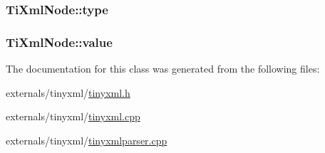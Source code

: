 \hypertarget{class_ti_xml_node_a2619c6379181c16ba95ae6922e2ca839}{
\subsubsection[{type}]{ Ti\-Xml\-Node\-::type\hspace{0.3cm}{\ttfamily [protected]}}}\label{class_ti_xml_node_a2619c6379181c16ba95ae6922e2ca839}
\hypertarget{class_ti_xml_node_aead528b3cedc33c16a6c539872c7cc8b}{
\subsubsection[{value}]{ Ti\-Xml\-Node\-::value\hspace{0.3cm}{\ttfamily [protected]}}}\label{class_ti_xml_node_aead528b3cedc33c16a6c539872c7cc8b}


The documentation for this class was generated from the following files\-:\begin{DoxyCompactItemize}
\item 
externals/tinyxml/\hyperlink{tinyxml_8h}{tinyxml.\-h}\item 
externals/tinyxml/\hyperlink{tinyxml_8cpp}{tinyxml.\-cpp}\item 
externals/tinyxml/\hyperlink{tinyxmlparser_8cpp}{tinyxmlparser.\-cpp}\end{DoxyCompactItemize}
